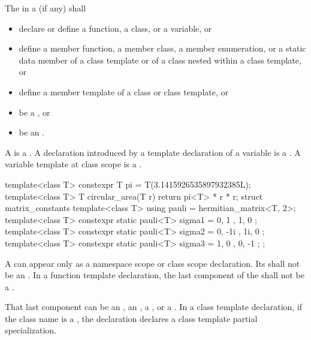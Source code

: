 \pnum
The
in a
(if any)
shall
\begin{itemize}
\item declare or define a function, a class, or a variable, or

\item define a member function, a member class, a member enumeration, or a static data member of a
class template or of a class nested within a class template, or

\item define a member template of a class or class template, or

\item be a , or

\item be an .
\end{itemize}

\pnum
A  is a .
A declaration introduced by a template declaration of a
%
variable is a . A variable template at class scope is a
.

\begin{example}
\begin{codeblock}
template<class T>
  constexpr T pi = T(3.1415926535897932385L);
template<class T>
  T circular_area(T r) {
    return pi<T> * r * r;
  }
struct matrix_constants {
  template<class T>
    using pauli = hermitian_matrix<T, 2>;
  template<class T>
    constexpr static pauli<T> sigma1 = { { 0, 1 }, { 1, 0 } };
  template<class T>
    constexpr static pauli<T> sigma2 = { { 0, -1i }, { 1i, 0 } };
  template<class T>
    constexpr static pauli<T> sigma3 = { { 1, 0 }, { 0, -1 } };
};
\end{codeblock}
\end{example}

\pnum
A
can appear only as a namespace scope or class scope declaration.
Its  shall not be an
.
In a function template declaration, the last component of the
shall not be a
.
\begin{note}
That last component can be an , an ,
a , or a . In
a class template declaration, if the
class name
is a
,
the declaration declares a class template partial specialization.
\end{note}


